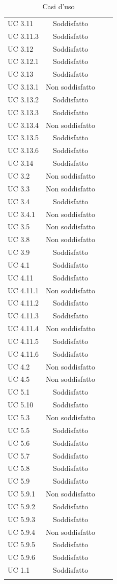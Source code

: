 \begin{longtable}{C{4cm} c c c}
UC 3.11 & Soddisfatto \\
UC 3.11.3 & Soddisfatto \\
UC 3.12 & Soddisfatto \\
UC 3.12.1 & Soddisfatto \\
UC 3.13 & Soddisfatto \\
UC 3.13.1 & Non soddisfatto \\
UC 3.13.2 & Soddisfatto \\
UC 3.13.3 & Soddisfatto \\
UC 3.13.4 & Non soddisfatto \\
UC 3.13.5 & Soddisfatto \\
UC 3.13.6 & Soddisfatto \\
UC 3.14 & Soddisfatto \\
UC 3.2 & Non soddisfatto \\
UC 3.3 & Non soddisfatto \\
UC 3.4 & Soddisfatto \\
UC 3.4.1 & Non soddisfatto \\
UC 3.5 & Non soddisfatto \\
UC 3.8 & Non soddisfatto \\
UC 3.9 & Soddisfatto \\
UC 4.1 & Soddisfatto \\
UC 4.11 & Soddisfatto \\
UC 4.11.1 & Non soddisfatto \\
UC 4.11.2 & Soddisfatto \\
UC 4.11.3 & Soddisfatto \\
UC 4.11.4 & Non soddisfatto \\
UC 4.11.5 & Soddisfatto \\
UC 4.11.6 & Soddisfatto \\
UC 4.2 & Non soddisfatto \\
UC 4.5 & Non soddisfatto \\
UC 5.1 & Soddisfatto \\
UC 5.10 & Soddisfatto \\
UC 5.3 & Non soddisfatto \\
UC 5.5 & Soddisfatto \\
UC 5.6 & Soddisfatto \\
UC 5.7 & Soddisfatto \\
UC 5.8 & Soddisfatto \\
UC 5.9 & Soddisfatto \\
UC 5.9.1 & Non soddisfatto \\
UC 5.9.2 & Soddisfatto \\
UC 5.9.3 & Soddisfatto \\
UC 5.9.4 & Non soddisfatto \\
UC 5.9.5 & Soddisfatto \\
UC 5.9.6 & Soddisfatto \\
UC 1.1 & Soddisfatto \\
\caption{Casi d'uso}
\end{longtable}
